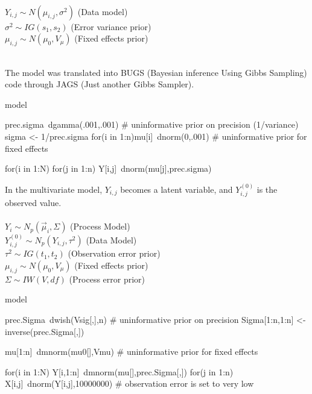 \documentclass[12pt,fleqn]{article}
\begin{document}
\\
\begin{linenomath*}
$Y_{i,j} \sim N(\mu_{i,j}, \sigma^2)$ (Data model)\\
$\sigma^2 \sim IG(s_1,s_2)$ (Error variance prior) \\
$\mu_{i,j} \sim N(\mu_0, V_\mu)$ (Fixed effects prior)
\end{linenomath*}\\
The model was translated into BUGS (Bayesian inference Using Gibbs Sampling) code through JAGS (Just another Gibbs Sampler). \citep{Gelman2013, Leb2013, LEBAUER2013, Lebauer2013, Plummer2010} 

\begin{singlespace}
\begin{VerbIn}
model{
  prec.sigma~dgamma(.001,.001) # uninformative prior on precision (1/variance)
  sigma <- 1/prec.sigma
  for(i in 1:n){mu[i]~dnorm(0,.001)} # uninformative prior for fixed effects
  
  for(i in 1:N){
      for(j in 1:n){
          Y[i,j]~dnorm(mu[j],prec.sigma)
          }
      }
  }
\end{VerbIn}
\end{singlespace}

\noindent In the multivariate model, $Y_{i,j}$ becomes a latent variable, and $Y^{(0)}_{i,j}$ is the observed value.  \\
\\
$Y_i \sim N_p(\vec{\mu}_i, \Sigma) $ (Process Model)\\
$Y^{(0)}_{i,j} \sim N_p(Y_{i,j}, \tau^2)$ (Data Model)\\
$\tau^2 \sim IG(t_1,t_2)$ (Observation error prior) \\ 
$\mu_{i,j} \sim N(\mu_0, V_\mu)$ (Fixed effects prior)\\
$\Sigma \sim IW(V, df)$ (Process error prior)  \begin{singlespace}
 \begin{VerbIn}
model{
  prec.Sigma~dwish(Vsig[,],n)  # uninformative prior on precision
  Sigma[1:n,1:n] <- inverse(prec.Sigma[,])
  
  mu[1:n]~dmnorm(mu0[],Vmu)    # uninformative prior for fixed effects
  
  for(i in 1:N){
      Y[i,1:n]~dmnorm(mu[],prec.Sigma[,])
      for(j in 1:n){
          X[i,j]~dnorm(Y[i,j],10000000) # observation error is set to very low  
          }
      }
  }
 \end{VerbIn}
\end{singlespace}
\end{document}
